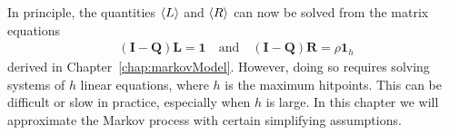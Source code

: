 In principle, the quantities $\left\langle L \right\rangle$ and $\left\langle R \right\rangle$ can now be solved from the matrix equations
\begin{gather*}
	(\mathbf{I} - \mathbf{Q})\mathbf{L} = \mathbf{1}
	\quad\mbox{and}\quad
	(\mathbf{I} - \mathbf{Q})\mathbf{R} = \rho\mathbf{1}_h
\end{gather*}
derived in Chapter~\ref{chap:markovModel}. However, doing so requires solving systems of $h$ linear equations, where $h$ is the maximum hitpoints. This can be difficult or slow in practice, especially when $h$ is large. In this chapter we will approximate the Markov process with certain simplifying assumptions.
